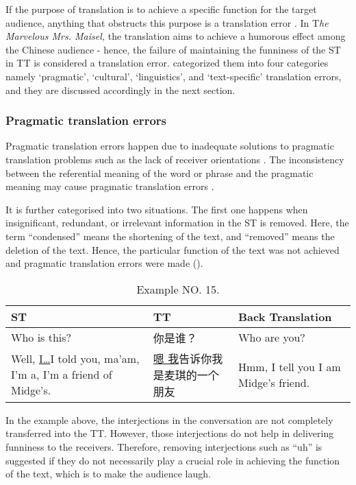 \documentclass[english]{textolivre}
\begin{document}
If the purpose of translation is to achieve a specific function for the target audience, anything that obstructs this purpose is a translation error \cite[p. 74]{nord_translation_2001}. In T\textit{he Marvelous Mrs. Maisel,} the translation aims to achieve a humorous effect among the Chinese audience - hence, the failure of maintaining the funniness of the ST in TT is considered a translation error. \textcite{nord_text_1997} categorized them into four categories namely `pragmatic', `cultural', `linguistics', and `text-specific' translation errors, and they are discussed accordingly in the next section.

\subsubsection{Pragmatic translation errors}

Pragmatic translation errors happen due to inadequate solutions to pragmatic translation problems such as the lack of receiver orientations \cite{rahmatillah_translation_2013, yap_problems_2018}. The inconsistency between the referential meaning of the word or phrase and the pragmatic meaning may cause pragmatic translation errors \cite{zheng_approach_2012}. 

It is further categorised into two situations. The first one happens when insignificant, redundant, or irrelevant information in the ST is removed. Here, the term “condensed” means the shortening of the text, and “removed” means the deletion of the text. Hence, the particular function of the text was not achieved and pragmatic translation errors were made ().

\begin{table}[htpb]
\caption{Example NO. 15.}
\label{tbl15}
\begin{tabularx}{\linewidth}{XXX}
\toprule 
ST  & TT & Back Translation \\ 
\midrule
Who is this? &  你是谁？ & Who are you?  \\

Well, 	\underline{I…}I 	told 	you, ma'am, I'm a, I'm a friend of Midge's.  &
\underline{嗯 我}告诉你我是麦琪的一个朋友  & 
Hmm, I tell you 
I am Midge's friend. \\ 
\bottomrule
\end{tabularx}
\end{table}

In the example above, the interjections in the conversation are not completely transferred into the TT. However, those interjections do not help in delivering funniness to the receivers. Therefore, removing interjections such as “uh” is suggested if they do not necessarily play a crucial role in achieving the function of the text, which is to make the audience laugh. 
\end{document}

